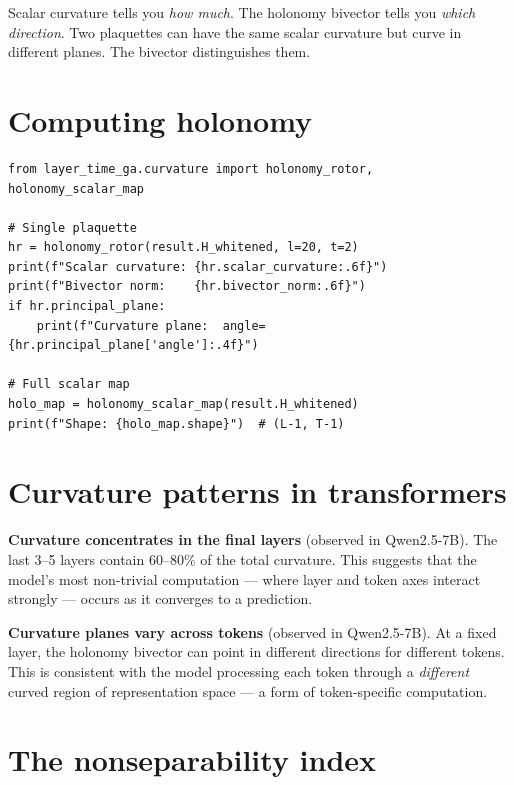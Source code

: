 \documentclass[11pt, twoside, openright]{memoir}
\begin{document}
\begin{keyidea}
Scalar curvature tells you \emph{how much}.  The holonomy bivector tells
you \emph{which direction}.  Two plaquettes can have the same scalar
curvature but curve in different planes.  The bivector distinguishes them.
\end{keyidea}

\section{Computing holonomy}

\begin{lstlisting}[caption={Holonomy at a single plaquette}]
from layer_time_ga.curvature import holonomy_rotor, holonomy_scalar_map

# Single plaquette
hr = holonomy_rotor(result.H_whitened, l=20, t=2)
print(f"Scalar curvature: {hr.scalar_curvature:.6f}")
print(f"Bivector norm:    {hr.bivector_norm:.6f}")
if hr.principal_plane:
    print(f"Curvature plane:  angle={hr.principal_plane['angle']:.4f}")

# Full scalar map
holo_map = holonomy_scalar_map(result.H_whitened)
print(f"Shape: {holo_map.shape}")  # (L-1, T-1)
\end{lstlisting}

\section{Curvature patterns in transformers}

\begin{finding}
\textbf{Curvature concentrates in the final layers} (observed in
Qwen2.5-7B).  The last 3--5 layers contain 60--80\% of the total
curvature.  This suggests that the model's most non-trivial computation
--- where layer and token axes interact strongly --- occurs as it
converges to a prediction.
\end{finding}

\begin{finding}
\textbf{Curvature planes vary across tokens} (observed in Qwen2.5-7B).
At a fixed layer, the holonomy bivector can point in different
directions for different tokens.  This is consistent with the model
processing each token through a \emph{different} curved region of
representation space --- a form of token-specific computation.
\end{finding}

\section{The nonseparability index}
\end{document}
